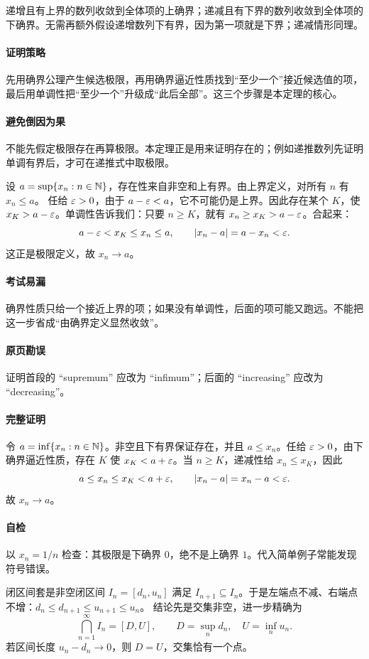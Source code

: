 递增且有上界的数列收敛到全体项的上确界；递减且有下界的数列收敛到全体项的下确界。无需再额外假设递增数列下有界，因为第一项就是下界；递减情形同理。
\paragraph{证明策略}先用确界公理产生候选极限，再用确界逼近性质找到“至少一个”接近候选值的项，最后用单调性把“至少一个”升级成“此后全部”。这三个步骤是本定理的核心。
\paragraph{避免倒因为果}不能先假定极限存在再算极限。本定理正是用来证明存在的；例如递推数列先证明单调有界后，才可在递推式中取极限。

设 $a=\sup\{x_n:n\in\mathbb{N}\}$，存在性来自非空和上有界。由上界定义，对所有 $n$ 有 $x_n\le a$。
任给 $\varepsilon>0$，由于 $a-\varepsilon<a$，它不可能仍是上界。因此存在某个 $K$，使 $x_K>a-\varepsilon$。单调性告诉我们：只要 $n\ge K$，就有 $x_n\ge x_K>a-\varepsilon$。合起来：
\[a-\varepsilon<x_K\le x_n\le a,\qquad |x_n-a|=a-x_n<\varepsilon.\]
这正是极限定义，故 $x_n\to a$。
\paragraph{考试易漏}确界性质只给一个接近上界的项；如果没有单调性，后面的项可能又跑远。不能把这一步省成“由确界定义显然收敛”。

\paragraph{原页勘误}证明首段的 ``supremum'' 应改为 ``infimum''；后面的 ``increasing'' 应改为 ``decreasing''。
\paragraph{完整证明}令 $a=\inf\{x_n:n\in\mathbb{N}\}$。非空且下有界保证存在，并且 $a\le x_n$。任给 $\varepsilon>0$，由下确界逼近性质，存在 $K$ 使 $x_K<a+\varepsilon$。当 $n\ge K$，递减性给 $x_n\le x_K$，因此
\[a\le x_n\le x_K<a+\varepsilon,\qquad |x_n-a|=x_n-a<\varepsilon.\]
故 $x_n\to a$。
\paragraph{自检}以 $x_n=1/n$ 检查：其极限是下确界 $0$，绝不是上确界 $1$。代入简单例子常能发现符号错误。

闭区间套是非空闭区间 $I_n=[d_n,u_n]$ 满足 $I_{n+1}\subseteq I_n$。于是左端点不减、右端点不增：$d_n\le d_{n+1}\le u_{n+1}\le u_n$。
结论先是交集非空，进一步精确为
\[\bigcap_{n=1}^{\infty}I_n=[D,U],\qquad D=\sup_n d_n,\quad U=\inf_n u_n.\]
若区间长度 $u_n-d_n\to0$，则 $D=U$，交集恰有一个点。

